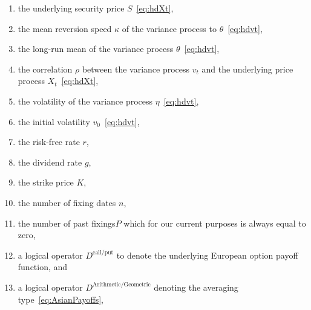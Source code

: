 \documentclass[11pt]{article}
\begin{document}
		\begin{enumerate}
			\item the underlying security price $S$~\eqref{eq:hdXt}, 
			\item the mean reversion speed $\kappa$ of the variance process to $\theta$~\eqref{eq:hdvt}, 
			\item the long-run mean of the variance process $\theta$~\eqref{eq:hdvt}, 
			\item the correlation $\rho$ between the variance process $v_t$ and the underlying price process $X_t$~\eqref{eq:hdXt}, 
			\item the volatility of the variance process $\eta$~\eqref{eq:hdvt}, 
			\item the initial volatility $v_{0}$~\eqref{eq:hdvt}, 
			\item the risk-free rate $r$, 
			\item the dividend rate $g$, 
			\item the strike price $K$, 
			\item the number of fixing dates $n$, 
			\item the number of past fixings$P$ which for our current purposes is always equal to zero, 
			\item a logical operator $D^{\text{call/put}}$ to denote the underlying European option payoff function, and
			\item a logical operator $D^{\text{Arithmetic/Geometric}}$ denoting the averaging type~\eqref{eq:AsianPayoffs},
		\end{enumerate}

	\vfill
	\newpage
	\vfill
\end{document}
